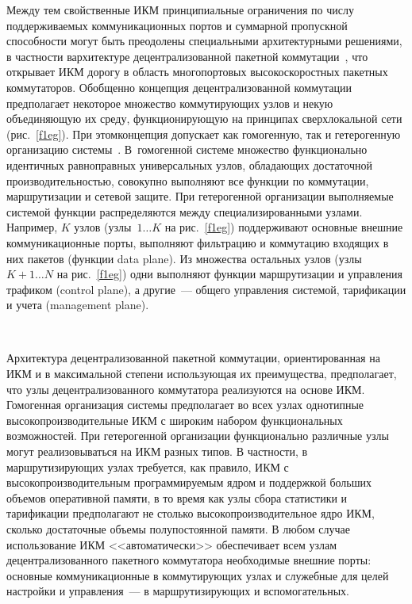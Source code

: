 \begin{multicols}{2}
     Между тем свойственные ИКМ принципиальные ограничения по числу 
поддерживаемых коммуникационных портов и суммарной пропускной способности могут 
быть преодолены специальными архитектурными решениями, в частности в\linebreak архитектуре 
децентрализованной пакетной коммутации~\cite{3eg, 4eg}, что открывает ИКМ дорогу в 
область многопортовых высокоскоростных пакетных коммутаторов. 
%
Обобщенно концепция 
децентра\-ли\-зованной коммутации предполагает некоторое множество коммутирующих узлов 
и некую объединяющую их среду, функционирующую на прин\-ципах сверхлокальной сети 
(рис.~\ref{f1eg}). При этом\linebreak кон\-цеп\-ция допускает как гомогенную, так и гетерогенную 
организацию системы~\cite{4eg}. В~гомогенной системе множество функционально 
идентичных равноправных универсальных узлов,\linebreak
 обладающих достаточной 
производительностью, совокупно выполняют все функции по коммутации, маршрутизации и 
сетевой защите. При гетерогенной организации выполняемые системой функции 
распределяются между специализированными узлами. Например, $K$ узлов (узлы~$1\ldots 
K$ на рис.~\ref{f1eg}) поддерживают основные внешние коммуникационные порты, 
выполняют фильтрацию и коммутацию входящих в них пакетов (функции data plane). Из 
множества остальных узлов (узлы $K+1\ldots N$ на рис.~\ref{f1eg}) одни выполняют 
функции маршрутизации и управления трафиком (control plane), а другие~--- общего 
управления системой, тарификации и учета (management plane).
\begin{figure*} %
\vspace*{1pt}
\begin{center}
\vspace*{1pt}
\mbox{%
\epsfxsize=88.426mm
}
\end{center}
\vspace*{-9pt}
     \end{figure*}


     Архитектура децентрализованной пакетной коммутации, ориентированная на ИКМ и в 
максимальной степени использующая их преимущества, предполагает, что узлы 
децентрализованного коммутатора реализуются на основе ИКМ. Гомогенная организация 
системы предполагает во всех узлах однотипные высокопроизводительные ИКМ с широким 
набором функциональных возможностей. При гетерогенной организации функционально 
различные узлы могут реализовываться на ИКМ разных типов. В частности, в 
маршрутизирующих узлах требуется, как правило, ИКМ с высокопроизводительным 
программируемым ядром и поддержкой больших объемов оперативной памяти, в то время 
как узлы сбора статистики и тарификации предполагают не столько 
высокопроизводительное ядро ИКМ, сколько достаточные объемы полупостоянной памяти. 
В любом случае использование ИКМ <<автоматически>> обеспечивает всем узлам 
децентрализованного пакетного коммутатора необходимые внешние порты: основные 
коммуникационные в коммутирующих узлах и служебные для целей настройки и 
управления~--- в маршрутизирующих и вспомогательных.


\end{multicols}
